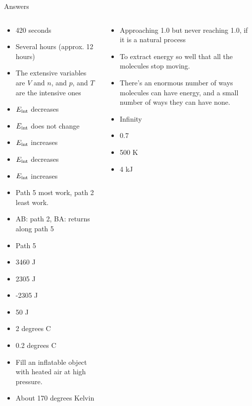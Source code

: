 \documentclass{beamer}
\begin{document}
\begin{frame}{Answers}
\tiny
\begin{columns}[T]
\begin{column}{0.5\textwidth}
\begin{itemize}
\item 420 seconds
\item Several hours (approx. 12 hours)
\item The extensive variables are $V$ and $n$, and $p$, and $T$ are the intensive ones
\item $E_{\rm int}$ decreases
\item $E_{\rm int}$ does not change
\item $E_{\rm int}$ increases
\item $E_{\rm int}$ decreases
\item $E_{\rm int}$ increases
\item Path 5 most work, path 2 least work.
\item AB: path 2, BA: returns along path 5
\item Path 5
\item 3460 J
\item 2305 J
\item -2305 J
\item 50 J
\item 2 degrees C
\item 0.2 degrees C
\item Fill an inflatable object with heated air at high pressure.
\item About 170 degrees Kelvin
\end{itemize}
\end{column}
\begin{column}{0.5\textwidth}
\begin{itemize}
\item Approaching 1.0 but never reaching 1.0, if it is a natural process
\item To extract energy so well that all the molecules stop moving.
\item There's an enormous number of ways molecules can have energy, and a small number of ways they can have none.
\item Infinity
\item 0.7
\item 500 K
\item 4 kJ
\end{itemize}
\end{column}
\end{columns}
\end{frame}
\end{document}
